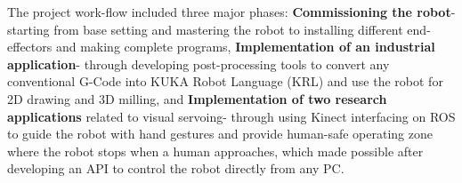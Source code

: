 The project work-flow included three major phases: \textbf{Commissioning the robot}- starting from base setting and mastering the robot to installing different end-effectors and making complete programs,  \textbf{Implementation of an industrial application}- through developing post-processing tools to convert any conventional G-Code into KUKA Robot Language (KRL) and use the robot for 2D drawing and 3D milling, and \textbf{ Implementation of two research applications} related to visual servoing- through using Kinect interfacing on ROS to guide the robot with hand gestures and provide human-safe operating zone where the robot stops when a human approaches, which made possible after developing an API to control the robot directly from any PC.